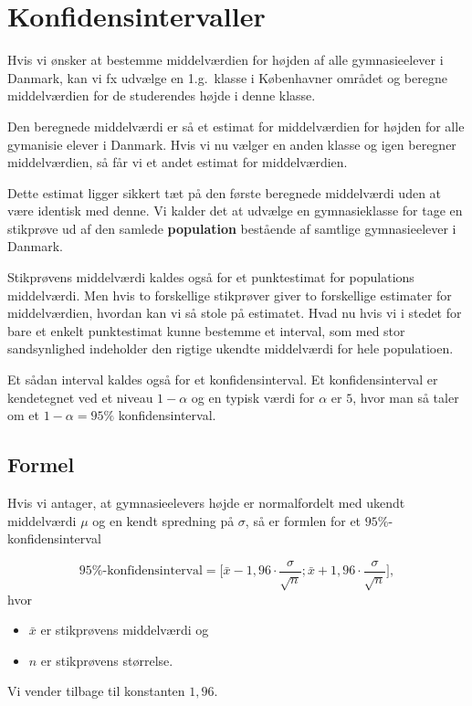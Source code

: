 \section{Konfidensintervaller}
Hvis vi ønsker at bestemme middelværdien for højden af alle gymnasieelever i
Danmark, kan vi fx udvælge en 1.g.\ klasse i Københavner området og beregne
middelværdien for de studerendes højde i denne klasse.

Den beregnede middelværdi er så et estimat for middelværdien for højden for alle
gymanisie elever i Danmark. Hvis vi nu vælger en anden klasse og igen beregner
middelværdien, så får vi et andet estimat for middelværdien.

Dette estimat ligger sikkert tæt på den første beregnede middelværdi uden at være
identisk med denne. Vi kalder det at udvælge en gymnasieklasse for tage en stikprøve
ud af den samlede \textbf{population} bestående af samtlige gymnasieelever i Danmark.

Stikprøvens middelværdi kaldes også for et punktestimat for populations
middelværdi. Men hvis to forskellige stikprøver giver to forskellige estimater for
middelværdien, hvordan kan vi så stole på estimatet. Hvad nu hvis vi i stedet for
bare et enkelt punktestimat kunne bestemme et interval, som med stor sandsynlighed
indeholder den rigtige ukendte middelværdi for hele populatioen.

Et sådan interval kaldes også for et konfidensinterval. Et konfidensinterval er
kendetegnet ved et niveau \(1 - \alpha\) og en typisk værdi for \(\alpha\) er \(5\),
hvor man så taler om et \(1-\alpha = 95\%\) konfidensinterval.

\subsection{Formel}
Hvis vi antager, at gymnasieelevers højde er normalfordelt med ukendt middelværdi
\(\mu\) og en kendt spredning på \(\sigma\), så er formlen for et
\(95\%\)-konfidens\-interval

\begin{equation}
  95\%\mbox{-konfidensinterval} = \Big[\bar{x} - 1,96⋅\frac{\sigma}{\sqrt{n}};
  \bar{x} +1,96⋅\frac{\sigma}{\sqrt{n}} \Big],
\end{equation}
hvor
\begin{itemize}
  \item \(\bar{x}\) er stikprøvens middelværdi og
  \item \(n\) er stikprøvens størrelse.
\end{itemize}
Vi vender tilbage til konstanten \(1,96\).

